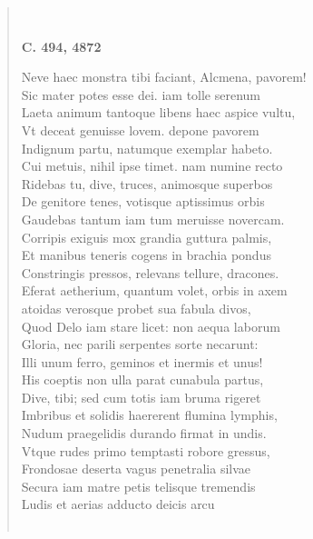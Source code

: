 \documentclass[11pt, a4paper]{report}
\begin{document}
\begin{verse}
        ﻿\pagebreak 
     \marginpar{[54]} \begin{center} \textbf{C. 494, 4872} \end{center}Neve haec monstra tibi faciant, Alcmena, pavorem! \\ Sic mater potes esse dei. iam tolle serenum \\ Laeta animum tantoque libens haec aspice vultu, \\ Vt deceat genuisse lovem. depone pavorem \\ Indignum partu, natumque exemplar habeto. \\ Cui metuis, nihil ipse timet. nam numine recto \\ Ridebas tu, dive, truces, animosque superbos \\ De genitore tenes, votisque aptissimus orbis \\ Gaudebas tantum iam tum meruisse novercam. \\ Corripis exiguis mox grandia guttura palmis, \\ Et manibus teneris cogens in brachia pondus \\ Constringis pressos, relevans tellure, dracones. \\ Eferat aetherium, quantum volet, orbis in axem \\ atoidas verosque probet sua fabula divos, \\ Quod Delo iam stare licet: non aequa laborum \\ Gloria, nec parili serpentes sorte necarunt: \\ Illi unum ferro, geminos et inermis et unus! \\ His coeptis non ulla parat cunabula partus, \\ Dive, tibi; sed cum totis iam bruma rigeret \\ Imbribus et solidis haererent flumina lymphis, \\ Nudum praegelidis durando firmat in undis. \\ Vtque rudes primo temptasti robore gressus, \\ Frondosae deserta vagus penetralia silvae \\ Secura iam matre petis telisque tremendis \\ Ludis et aerias adducto deicis arcu \\ 
        ﻿\pagebreak 

\end{verse}
\end{document}
